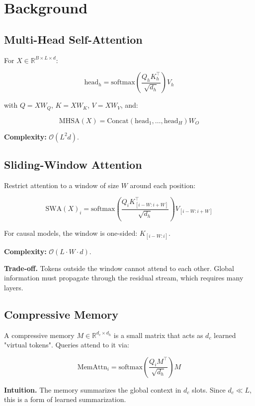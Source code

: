 
\section{Background}

\subsection{Multi-Head Self-Attention}

For $X \in \mathbb{R}^{B \times L \times d}$:

\[
\text{head}_h = \text{softmax}\!\left(\frac{Q_h K_h^\top}{\sqrt{d_h}}\right) V_h
\tag{3.1}
\]

with $Q = X W_Q$, $K = X W_K$, $V = X W_V$, and:

\[
\text{MHSA}(X) = \text{Concat}(\text{head}_1, \dots, \text{head}_H) W_O
\tag{3.2}
\]

\textbf{Complexity:} $\mathcal{O}(L^2 d)$.

\subsection{Sliding-Window Attention}

Restrict attention to a window of size $W$ around each position:

\[
\text{SWA}(X)_i = \text{softmax}\!\left(\frac{Q_i K_{[i-W:i+W]}^\top}{\sqrt{d_h}}\right) V_{[i-W:i+W]}
\tag{3.3}
\]

For causal models, the window is one-sided: $K_{[i-W:i]}$.

\textbf{Complexity:} $\mathcal{O}(L \cdot W \cdot d)$.

\textbf{Trade-off.} Tokens outside the window cannot attend to each other. 
Global information must propagate through the residual stream, which 
requires many layers.

\subsection{Compressive Memory}

A compressive memory $M \in \mathbb{R}^{d_c \times d_h}$ is a small matrix 
that acts as $d_c$ learned "virtual tokens". Queries attend to it via:

\[
\text{MemAttn}_i = \text{softmax}\!\left(\frac{Q_i M^\top}{\sqrt{d_h}}\right) M
\tag{3.4}
\]

\textbf{Intuition.} The memory summarizes the global context in $d_c$ slots. 
Since $d_c \ll L$, this is a form of learned summarization.

